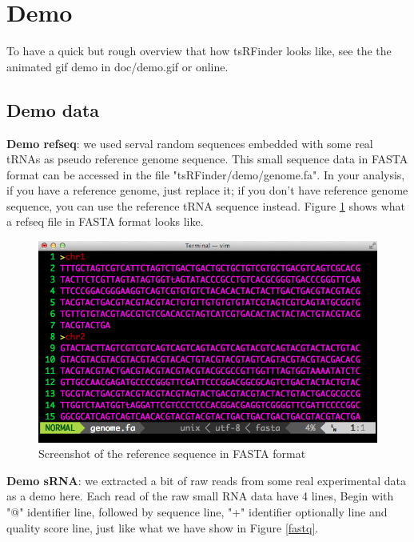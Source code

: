\documentclass[11pt, a4paper]{article}
\begin{document}
\section{Demo}

To have a quick but rough overview that how tsRFinder looks like, see the the animated gif demo in doc/demo.gif or online.

\subsection{Demo data}

\textbf{Demo refseq}: we used serval random sequences embedded with some real tRNAs as pseudo reference genome sequence. This small sequence data in FASTA format can be accessed in the file "tsRFinder/demo/genome.fa". In your analysis, if you have a reference genome, just replace it; if you don't have reference genome sequence, you can use the reference tRNA sequence instead. Figure \ref{refseq} shows what a refseq file in FASTA format looks like.

\begin{figure}[htbp]
\begin{center}
\includegraphics[width=12cm]{refseq.png}
\caption{Screenshot of the reference sequence in FASTA format} 
\label{refseq}
\end{center}
\end{figure}

\textbf{Demo sRNA}: we extracted a bit of raw reads from some real experimental data as a demo here. Each read of the raw small RNA data have 4 lines, Begin with "@" identifier line, followed by sequence line, "+" identifier optionally line and quality score line, just like what we have show in Figure \ref{fastq}.
\end{document}
